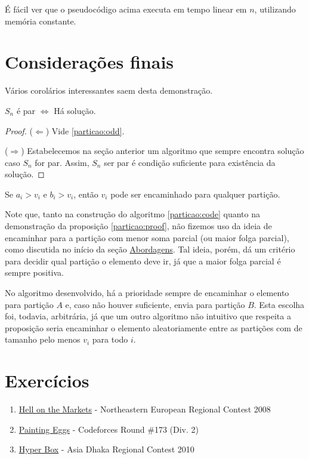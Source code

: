 É fácil ver que o pseudocódigo acima executa em tempo linear em $n$, utilizando memória constante.

\section{Considerações finais}

Vários corolários interessantes saem desta demonstração.

\begin{cor}
$S_n$ é par $\Leftrightarrow$ Há solução.
\end{cor}
\begin{proof}

($\Leftarrow$) Vide \ref{particao:odd}.

($\Rightarrow$) Estabelecemos na seção anterior um algoritmo que sempre encontra solução caso $S_n$ for par. Assim, $S_n$ ser par é condição suficiente para existência da solução.

\end{proof}

\begin{cor}
Se $a_i > v_i$ e $b_i > v_i$, então $v_i$ pode ser encaminhado para qualquer partição.
\end{cor}

Note que, tanto na construção do algoritmo \ref{particao:code} quanto na demonstração da proposição \ref{particao:proof}, não fizemos uso da ideia de encaminhar para a partição com menor soma parcial (ou maior folga parcial), como discutida no início da seção \hyperref[particao:abordagem]{Abordagens}. Tal ideia, porém, dá um critério para decidir qual partição o elemento deve ir, já que a maior folga parcial é sempre positiva.

No algoritmo desenvolvido, há a prioridade sempre de encaminhar o elemento para partição $A$ e, caso não houver  suficiente, envia para partição $B$. Esta escolha foi, todavia, arbitrária, já que um outro algoritmo não intuitivo que respeita a proposição seria encaminhar o elemento aleatoriamente entre as partições com  de tamanho pelo menos $v_i$ para todo $i$.

\section{Exercícios}

\begin{enumerate}
  \item \href{https://icpcarchive.ecs.baylor.edu/index.php?option=onlinejudge&page=show_problem&problem=2379}{Hell on the Markets} - Northeastern European Regional Contest 2008
  \item \href{https://codeforces.com/problemset/problem/282/B}{Painting Eggs} - Codeforces Round \#173 (Div. 2)
  \item \href{https://icpcarchive.ecs.baylor.edu/index.php?option=com_onlinejudge&Itemid=8&page=show_problem&problem=2856}{Hyper Box} - Asia Dhaka Regional Contest 2010

\end{enumerate}
